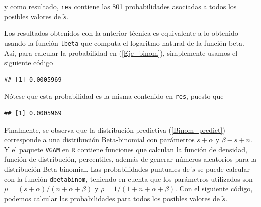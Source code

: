     y como resultado, \verb"res" contiene las 801 probabilidades asociadas a todos los posibles valores de $\tilde{s}$.
    
    Los resultados obtenidos con la anterior t\'ecnica es equivalente a lo obtenido usando la funci\'on \verb"lbeta" que computa el logaritmo natural de la funci\'on beta. As\'i, para calcular la probabilidad en (\ref{Eje_binom}), simplemente usamos el siguiente c\'odigo 
    
\begin{knitrout}
\color{fgcolor}\begin{kframe}
\begin{alltt}
\hlstd{(}\hlstd{,}\hlstd{)}\hlopt{*}\hlstd{(}\hlstd{(}\hlstd{,}\hlstd{)}\hlopt{-}\hlstd{(}\hlstd{,}\hlstd{))}
\end{alltt}
\begin{verbatim}
## [1] 0.0005969
\end{verbatim}
\end{kframe}
\end{knitrout}
    N\'otese que esta probabilidad es la misma contenido en \verb"res", puesto que
\begin{knitrout}
\color{fgcolor}\begin{kframe}
\begin{alltt}
\hlstd{res[}\hlstd{]}
\end{alltt}
\begin{verbatim}
## [1] 0.0005969
\end{verbatim}
\end{kframe}
\end{knitrout}
    Finalmente, se observa que la distribuci\'on predictiva (\ref{Binom_predict}) corresponde a una distribuci\'on Beta-binomial con par\'ametros $s+\alpha$ y $\beta-s+n$. Y el paquete \verb"VGAM" en \verb"R" \cite{VGAM} contiene funciones que calculan la funci\'on de densidad, funci\'on de distribuci\'on, percentiles, adem\'as de generar n\'umeros aleatorios para la distribuci\'on Beta-binomial. Las probabilidades puntuales de $\tilde{s}$ se puede calcular con la funci\'on \verb"dbetabinom", teniendo en cuenta que los par\'ametros utilizados son $\mu=(s+\alpha)/(n+\alpha+\beta)$ y $\rho=1/(1+n+\alpha+\beta)$. Con el siguiente c\'odigo, podemos calcular las probabilidades para todos los posibles valores de $\tilde{s}$.
    
